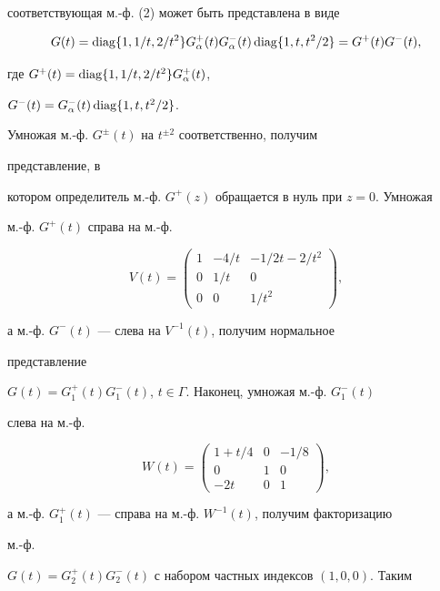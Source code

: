 \begin{examnonum}
соответствующая м.-ф. (2) может быть представлена в виде 


$$ 


G(t)=\diag\{1,1/t,2/t^2\}G^+_\alpha(t)G^-_\alpha(t) 


\diag\{1,t,t^2/2\}=G^+(t)G^-(t), 


$$ 


где $G^+(t)=\operatorname{diag}\{1,1/t,2/t^2\}G^+_\alpha(t)$, 


$G^-(t)=G^-_\alpha(t)\operatorname{diag}\{1,t,t^2/2\}$. 


Умножая м.-ф. $G^\pm(t)$ на $t^{\pm2}$ соответственно, получим 


представление, в 


котором определитель м.-ф. $G^+(z)$ обращается в нуль при $z=0$. Умножая 


м.-ф. $G^+(t)$ справа на м.-ф. 


$$ 


V(t)= 


\begin{pmatrix} 


1 & -4/t & -1/2t-2/t^2 \\ 


0 & 1/t & 0 \\ 0 & 0 & 1/t^2 


\end{pmatrix} 


, 


$$ 


а м.-ф. $G^-(t)$ --- слева на $V^{-1}(t)$, получим нормальное 


представление 


$G(t)=G^+_1(t)G^-_1(t)$, $t\in\Gamma$. Наконец, умножая м.-ф. $G^-_1(t)$ 


слева на м.-ф. 


$$ 


W(t)= 


\begin{pmatrix} 


1+t/4 & 0 & -1/8 \\ 0 & 1 & 0 \\ -2t & 0 & 1 


\end{pmatrix} 


, 


$$ 


а м.-ф. $G^+_1(t)$ --- справа на м.-ф. $W^{-1}(t)$, получим факторизацию 


м.-ф. 


$G(t)=G^+_2(t)G^-_2(t)$ с набором частных индексов $(1,0,0)$. Таким 



\end{examnonum}
